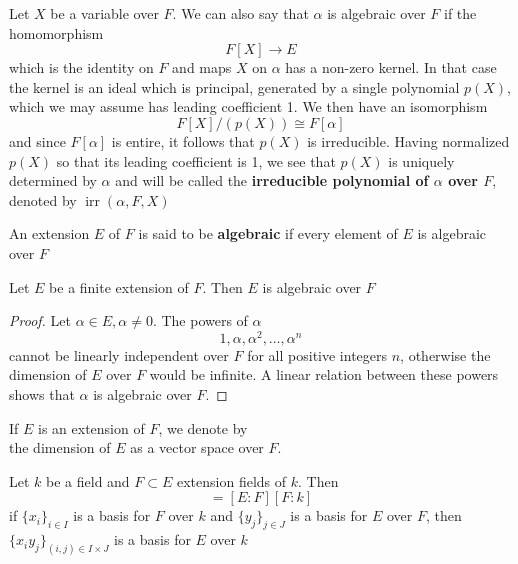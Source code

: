 \documentclass[11pt]{article}
\def \irr {\operatorname{irr}}
\begin{document}
Let \(X\) be a variable over \(F\). We can also say that \(\alpha\) is algebraic over \(F\) if the
homomorphism
\begin{equation*}
F[X]\to E
\end{equation*}
which is the identity on \(F\) and maps \(X\) on \(\alpha\) has a non-zero kernel. In that case the kernel
is an ideal which is principal, generated by a single polynomial \(p(X)\), which we may assume
has leading coefficient 1. We then have an isomorphism
\begin{equation*}
F[X]/(p(X))\cong F[\alpha]
\end{equation*}
and since \(F[\alpha]\) is entire, it follows that \(p(X)\) is irreducible. \label{Problem4} Having
normalized \(p(X)\) so that its leading coefficient is 1, we see that \(p(X)\) is uniquely
determined by \(\alpha\) and will be called the \textbf{irreducible polynomial of \(\alpha\) over \(F\)}, denoted by \(\irr(\alpha,F,X)\)

An extension \(E\) of \(F\) is said to be \textbf{algebraic} if every element of \(E\) is algebraic
over \(F\)

\begin{proposition}[]
\label{prop5.1.1}
Let \(E\) be a finite extension of \(F\). Then \(E\) is algebraic over \(F\)
\end{proposition}

\begin{proof}
Let \(\alpha\in E,\alpha\neq 0\). The powers of \(\alpha\)
\begin{equation*}
1,\alpha,\alpha^2,\dots,\alpha^n
\end{equation*}
cannot be linearly independent over \(F\) for all positive integers \(n\), otherwise the
dimension of \(E\) over \(F\) would be infinite. A linear relation between these powers shows
that \(\alpha\) is algebraic over \(F\).
\end{proof}

If \(E\) is an extension of \(F\), we denote by
\begin{equation*}
[E:F]
\end{equation*}
the dimension of \(E\) as a vector space over \(F\).

\begin{proposition}[]
Let \(k\) be a field and \(F\subset E\) extension fields of \(k\). Then
\begin{equation*}
[E:k]=[E:F][F:k]
\end{equation*}
if \(\{x_i\}_{i\in I}\) is a basis for \(F\) over \(k\) and \(\{y_j\}_{j\in J}\) is a basis for \(E\)
over \(F\), then \(\{x_iy_j\}_{(i,j)\in I\times J}\) is a basis for \(E\) over \(k\)
\end{proposition}
\end{document}
